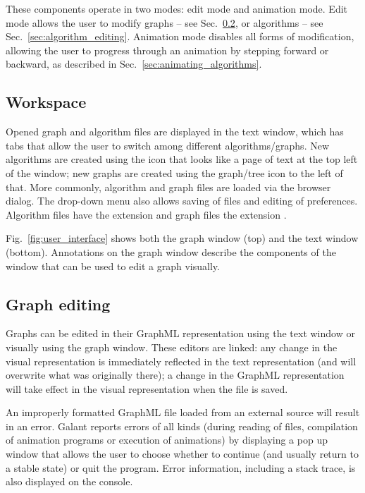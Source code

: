 These components operate in two modes: edit mode and animation mode.
Edit mode allows the user to modify graphs -- see Sec.~\ref{sec:graph_editing},
or algorithms -- see Sec.~\ref{sec:algorithm_editing}. Animation mode disables all forms of modification, allowing the user to progress through
an animation by stepping forward or backward, as described in
Sec.~\ref{sec:animating_algorithms}.

\subsection{Workspace}

Opened graph and algorithm files are displayed in the text window,
which has tabs that allow the user to switch among different algorithms/graphs.
New algorithms are created using the icon that looks like
a page of text at the top left of the
window; new graphs are created
using the graph/tree icon to the left of that.
More commonly, algorithm and graph files are loaded via the 
browser dialog. The  drop-down menu also allows saving of files
and editing of preferences. Algorithm files have the extension 
and graph files the extension .

Fig.~\ref{fig:user_interface} shows both the graph window (top) and the text
window (bottom). Annotations on the graph window describe the components of
the window that can be used to edit a graph visually.

\subsection{Graph editing}
\label{sec:graph_editing}

Graphs can be edited in their GraphML representation using the text window
or visually using the graph window.
These editors are linked:
any change in the visual representation is immediately reflected in the text
representation (and will overwrite what was originally there);
a change in the GraphML representation will take effect in the visual representation
when the file is saved.

An improperly formatted GraphML file loaded from an external source will
result in an error.
Galant reports errors of all kinds (during reading of files, compilation of
animation programs or execution of animations)
by displaying a pop up window that allows the user to choose whether to
continue (and usually return to a stable state) or quit the program.
Error information, including a stack trace, is also displayed on the console.

